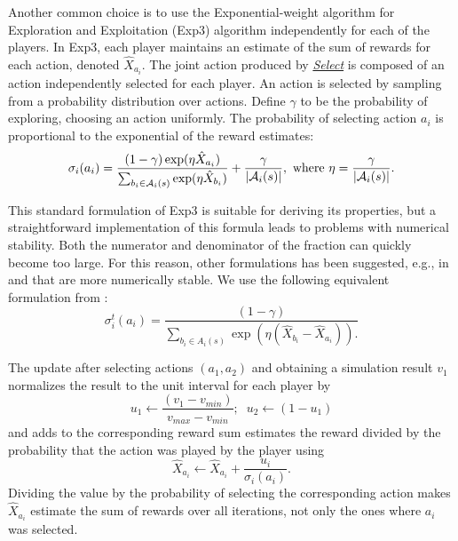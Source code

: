 Another common choice is to use the Exponential-weight algorithm for Exploration and Exploitation (Exp3)
algorithm \cite{Auer2003Exp3} independently for each of the players.
In Exp3, each player maintains an estimate of the sum of rewards for each action, denoted $\hat{X}_{a_i}$. 
The joint action produced by \emph{\underline{Select}} is composed of an action independently selected for each player.
An action is selected by sampling from a probability distribution over actions.
Define $\gamma$ to be the probability of exploring, \ie choosing an action uniformly. 
The probability of selecting action $a_i$ is proportional to the exponential of the reward estimates:
\begin{equation}\label{eq:exp3select}
\sigma_i(a_i) = \frac{(1-\gamma) \exp(\eta \hat{X}_{a_i})}{\sum_{b_i \in \mathcal{A}_i(s)} \exp(\eta \hat{X}_{b_i})} + \frac{\gamma}{|\mathcal{A}_i(s)|},
  \mbox{ where } \eta = \frac{\gamma}{|\mathcal{A}_i(s)|}.
\end{equation}

This standard formulation of Exp3 is suitable for deriving its properties, but a straightforward implementation of this formula leads to problems with numerical stability. Both the numerator and denominator of the fraction can quickly become too large. For this reason, other formulations has been suggested, e.g., in \cite{Lanctot13Goofspiel} and \cite{Cowling12ISMCTS} that are more numerically stable. We use the following equivalent formulation from \cite{Cowling12ISMCTS}:
\begin{equation}
\sigma^t_i(a_i) = \frac{(1-\gamma)}{\sum_{b_i \in A_i(s)}\exp(\eta(\hat{X}_{b_i}-\hat{X}_{a_i})).}
\end{equation}

The update after selecting actions $(a_1,a_2)$ and obtaining a simulation result $v_1$ normalizes the result to the unit interval for each player by
\begin{equation}
u_1 \leftarrow \frac{(v_1 - v_{min})}{v_{max} - v_{min}};\;\; u_2 \leftarrow (1-u_1)
\end{equation}
and adds to the corresponding reward sum estimates the reward divided by the probability that the action was played by the player using
\begin{equation}
\hat{X}_{a_i} \leftarrow \hat{X}_{a_i} + \frac{u_i}{\sigma_i(a_i)}.
\end{equation}
Dividing the value by the probability of selecting the corresponding action makes $\hat{X}_{a_i}$ estimate the sum of rewards over all
iterations, not only the ones where $a_i$ was selected.


